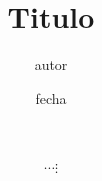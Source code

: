 \documentclass[a4paper]{article}
\title{Titulo}
\author{autor }
\date{fecha}
\begin{document}
 

	$$ 
	
		\cdots %
		\vdots %

	$$
\end{document}
